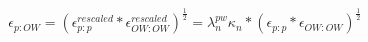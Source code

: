 \begin{center}
    \begin{equation}
        \epsilon_{p:OW}=(\epsilon_{p:p}^{rescaled} * \epsilon_{OW:OW}^{rescaled})^{\frac{1}{2}}=\lambda_{n}^{pw}\kappa_{n}*(\epsilon_{p:p} * \epsilon_{OW:OW})^{\frac{1}{2}}
    \label{eq:wat_scaling}
    \end{equation}
\end{center}